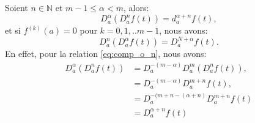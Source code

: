 Soient $n\in\mathbb{N}$ et $m-1\leq\alpha<m$, alors:
\begin{equation}\label{eq:comp_o_n}
    D_a^{\alpha}(D_a^n f(t)) = d_a^{\alpha+n}f(t),
\end{equation}
et si $f^{(k)}(a)=0$ pour $k=0,1,..m-1$, nous avons:
\begin{equation}
    D_a^n\left( D_a^{\alpha} f(t) \right) = D_a^{N+\alpha} f(t).
\end{equation}
En effet, pour la relation \ref{eq:comp_o_n}, nous avons:
\begin{align*}
    D_a^{\alpha}(D_a^n f(t)) &= D_a^{-(m-\alpha)} D_a^m(D_a^n f(t)),\\
    &= D_a^{-(m-\alpha)} D_a^{m+n} f(t),\\
    &= D_a^{-(m+n-(\alpha +n)} D_a^{m+n} f(t)\\
    &= D_a^{\alpha + n} f(t)
\end{align*}

